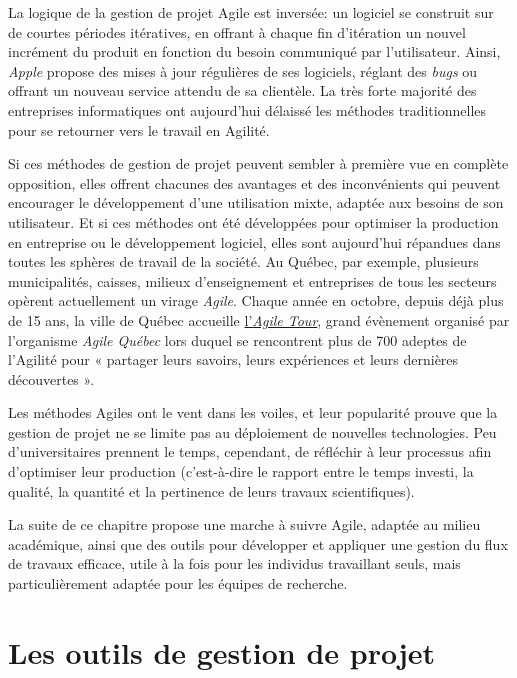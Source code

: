 \documentclass[
  letterpaper,
  DIV=11,
  numbers=noendperiod]{scrreprt}
\begin{document}
La logique de la gestion de projet Agile est inversée: un logiciel se
construit sur de courtes périodes itératives, en offrant à chaque fin
d'itération un nouvel incrément du produit en fonction du besoin
communiqué par l'utilisateur. Ainsi, \emph{Apple} propose des mises à
jour régulières de ses logiciels, réglant des \emph{bugs} ou offrant un
nouveau service attendu de sa clientèle. La très forte majorité des
entreprises informatiques ont aujourd'hui délaissé les méthodes
traditionnelles pour se retourner vers le travail en Agilité.

Si ces méthodes de gestion de projet peuvent sembler à première vue en
complète opposition, elles offrent chacunes des avantages et des
inconvénients qui peuvent encourager le développement d'une utilisation
mixte, adaptée aux besoins de son utilisateur. Et si ces méthodes ont
été développées pour optimiser la production en entreprise ou le
développement logiciel, elles sont aujourd'hui répandues dans toutes les
sphères de travail de la société. Au Québec, par exemple, plusieurs
municipalités, caisses, milieux d'enseignement et entreprises de tous
les secteurs opèrent actuellement un virage \emph{Agile}. Chaque année
en octobre, depuis déjà plus de 15 ans, la ville de Québec accueille
\href{https://www.agilequebec.ca/fr/}{l'\emph{Agile Tour}}, grand
évènement organisé par l'organisme \emph{Agile Québec} lors duquel se
rencontrent plus de 700 adeptes de l'Agilité pour « partager leurs
savoirs, leurs expériences et leurs dernières découvertes ».

Les méthodes Agiles ont le vent dans les voiles, et leur popularité
prouve que la gestion de projet ne se limite pas au déploiement de
nouvelles technologies. Peu d'universitaires prennent le temps,
cependant, de réfléchir à leur processus afin d'optimiser leur
production (c'est-à-dire le rapport entre le temps investi, la qualité,
la quantité et la pertinence de leurs travaux scientifiques).

La suite de ce chapitre propose une marche à suivre Agile, adaptée au
milieu académique, ainsi que des outils pour développer et appliquer une
gestion du flux de travaux efficace, utile à la fois pour les individus
travaillant seuls, mais particulièrement adaptée pour les équipes de
recherche.

\hypertarget{les-outils-de-gestion-de-projet}{%
\section{Les outils de gestion de
projet}\label{les-outils-de-gestion-de-projet}}
\end{document}
